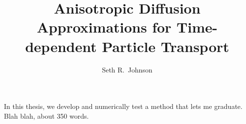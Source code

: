 \documentclass{umthesis}
\author{Seth R.~Johnson}
\title{Anisotropic Diffusion Approximations for Time-dependent Particle
Transport}
\begin{document}
\begin{finalabstract}

In this thesis, we develop and numerically test a method that lets me graduate.
Blah blah, about 350 words.
\end{finalabstract}

\end{document}
